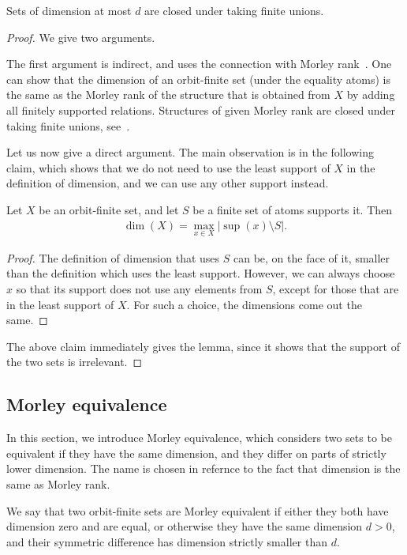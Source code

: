 \begin{lemma}\label{lem:dimension-unions}
	Sets of dimension at most $d$ are closed under taking finite unions.
\end{lemma}
\begin{proof}
	We give two arguments.

	The first argument is indirect, and uses the connection with Morley rank~\cite[p.~240]{hodges1993model}. One can show that the dimension of an orbit-finite set (under the equality atoms) is the same as the Morley rank of the structure that is obtained from $X$ by adding all finitely supported relations. Structures of given Morley rank are closed under taking finite unions, see~\cite[p. 225]{Ziegler_2008}.

	Let us now give a direct argument. The main observation is in the following claim, which shows that we do not need to use the least support of $X$ in the definition of dimension, and we can use any other support instead.

	\begin{claim}\label{claim:dimension-supports}
		Let $X$ be an orbit-finite set, and let $S$ be a finite set of atoms supports it. Then
		\begin{align*}
			\dim(X) = \max_{x \in X} |\sup(x) \setminus S|.
		\end{align*}
	\end{claim}
	\begin{proof}
		The definition of dimension that uses $S$ can be, on the face of it, smaller than the definition which uses the least support. However, we can always choose $x$ so that its support does not use any elements from $S$, except for those that are in the least support of $X$. For such a choice, the dimensions come out the same.
	\end{proof}
	The above claim immediately gives the lemma, since it shows that the support of the two sets is irrelevant.
\end{proof}


\subsection{Morley equivalence}
\label{sec:morley-equivalence}
In this section, we introduce Morley equivalence, which considers two sets to be equivalent if they have the same dimension, and they differ on parts of strictly lower dimension. The name is chosen in refernce to the fact that dimension is the same as Morley rank.

\begin{definition} We say that two orbit-finite sets  are Morley equivalent if either they both have dimension zero and are equal, or otherwise they have the same dimension $d>0$,  and their symmetric difference  has dimension strictly smaller than $d$.
\end{definition}

